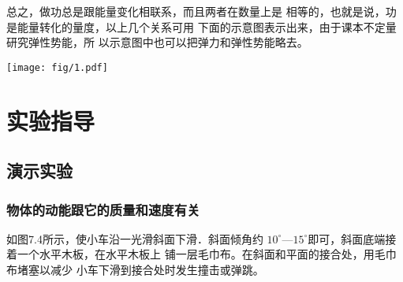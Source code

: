 总之，做功总是跟能量变化相联系，而且两者在数量上是
相等的，也就是说，功是能量转化的量度，以上几个关系可用
下面的示意图表示出来，由于课本不定量研究弹性势能，所
以示意图中也可以把弹力和弹性势能略去。

\begin{center}
\texttt{[image: fig/1.pdf]}
\end{center}

\section{实验指导}
\subsection{演示实验}
\subsubsection{物体的动能跟它的质量和速度有关}
如图7.4所示，使小车沿一光滑斜面下滑．斜面倾角约
$10^{\circ}$—$15^{\circ}$即可，斜面底端接着一个水平木板，在水平木板上
铺一层毛巾布。在斜面和平面的接合处，用毛巾布堵塞以减少
小车下滑到接合处时发生撞击或弹跳。
















































































